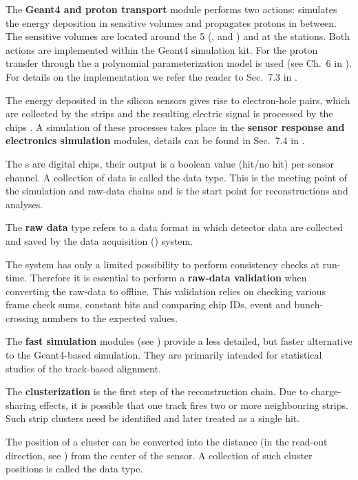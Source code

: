 \> The {\bf Geant4 and proton transport} module performs two actions: simulates the energy deposition in sensitive volumes and propagates protons in between. The sensitive volumes are located around the 5 (,  and ) and at the  stations. Both actions are implemented within the Geant4  simulation kit. For the proton transfer through the  a polynomial parameterization model is used (see Ch.~6 in ). For details on the implementation we refer the reader to Sec.~7.3 in .

\> The energy deposited in the silicon sensors gives rise to electron-hole pairs, which are collected by the strips and the resulting electric signal is processed by the  chips . A simulation of these processes takes place in the {\bf sensor response and electronics simulation} modules, details can be found in Sec.~7.4 in .

\> The s are digital chips, their output is a boolean value (hit/no hit) per sensor channel. A collection of  data is called the {\bf {}} data type. This is the meeting point of the simulation and raw-data chains and is the start point for reconstructions and analyses.

\> The {\bf raw data} type refers to a data format in which detector data are collected and saved by the data acquisition () system.

\> The  system has only a limited possibility to perform consistency checks at run-time. Therefore it is essential to perform a {\bf raw-data validation} when converting the raw-data to  offline. This validation relies on checking various frame check sums, constant bits and comparing chip IDs, event and bunch-crossing numbers to the expected values.

\> The {\bf fast simulation} modules (see ) provide a less detailed, but faster alternative to the Geant4-based simulation. They are primarily intended for statistical studies of the track-based alignment.

\> The {\bf clusterization} is the first step of the reconstruction chain. Due to charge-sharing effects, it is possible that one track fires two or more neighbouring strips. Such strip clusters need be identified and later treated as a single hit.

\> The position of a cluster can be converted into the distance (in the read-out direction, see ) from the center of the sensor. A collection of such cluster positions is called the {\bf {}} data type.

